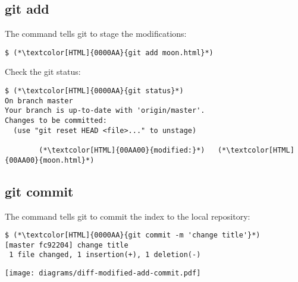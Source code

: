 \subsection{git add}
\begin{frame}[fragile]
  \subslidetitle

  The command  tells git to stage the modifications:
  \begin{lstlisting}
$ (*\textcolor[HTML]{0000AA}{git add moon.html}*)
\end{lstlisting}

  Check the git status:
  \begin{lstlisting}
$ (*\textcolor[HTML]{0000AA}{git status}*)
On branch master
Your branch is up-to-date with 'origin/master'.
Changes to be committed:
  (use "git reset HEAD <file>..." to unstage)

        (*\textcolor[HTML]{00AA00}{modified:}*)   (*\textcolor[HTML]{00AA00}{moon.html}*)
  \end{lstlisting}
\end{frame}

\subsection{git commit}
\begin{frame}[fragile]
  \subslidetitle

  The command  tells git to commit the index to the local repository:
  \begin{lstlisting}
$ (*\textcolor[HTML]{0000AA}{git commit -m 'change title'}*)
[master fc92204] change title
 1 file changed, 1 insertion(+), 1 deletion(-)
\end{lstlisting}

  \centerline{\texttt{[image: diagrams/diff-modified-add-commit.pdf]}}
\end{frame}

